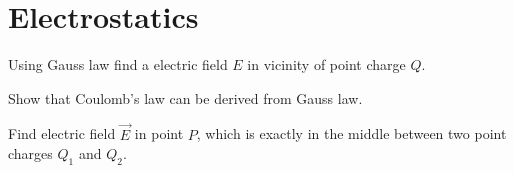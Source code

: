\section{Electrostatics}


\begin{Exercise}[difficulty=1]
Using Gauss law find a electric field $E$ in vicinity of point charge $Q$.
\end{Exercise}

\begin{Exercise}[difficulty=2]
Show that Coulomb's law can be derived from Gauss law.
\end{Exercise}

\begin{Exercise}[difficulty=2,label=e2]
Find electric field $\vec{E}$ in point $P$, which is exactly in the middle between two point charges $Q_1$ and $Q_2$. 
\end{Exercise}
